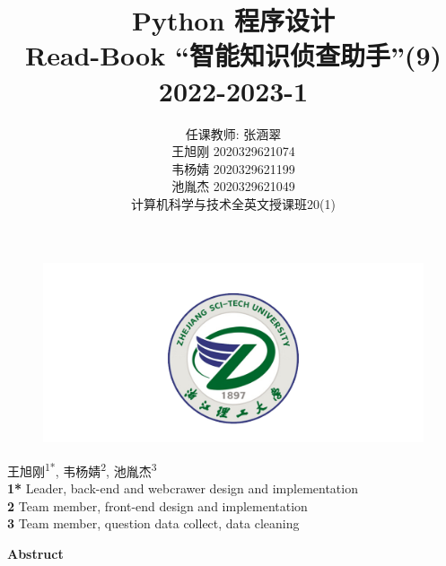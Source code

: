 \documentclass[twoside,11pt]{article}
\newcommand\studentName{\Large \centering 任课教师: 张涵翠\\王旭刚 2020329621074\\韦杨婧 2020329621199\\池胤杰 2020329621049\\计算机科学与技术全英文授课班20(1)\\}
\begin{document}
\begin{figure}[H]
    \centering
    \includegraphics[width=1\columnwidth]{figures/zstu-logo.png}
\end{figure}

\title{\Huge Python 程序设计\\ \vspace{1.5cm} Read-Book ``智能知识侦查助手''(9) \\ \vspace{1.5cm} \huge 2022-2023-1 \\ \vspace{0.8cm}}

\author{\name \studentName{}
    \addr
}

\maketitle
\thispagestyle{empty}
\newpage




\begin{center}
    王旭刚\textsuperscript{1*},
    韦杨婧\textsuperscript{2},
    池胤杰\textsuperscript{3}
    \\
    \bigskip
    \textbf{1*} Leader, back-end and webcrawer design and implementation
    \\
    \textbf{2} Team member, front-end design and implementation
    \\
    \textbf{3} Team member, question data collect, data cleaning
    \\
    \bigskip
\end{center}




\begin{center}
    \Large\textbf{Abstruct}
\end{center}
\end{document}
